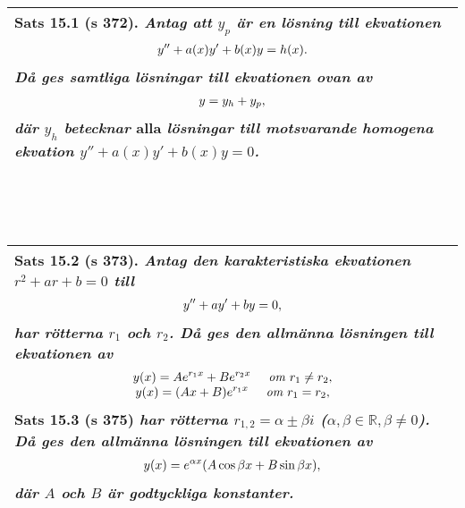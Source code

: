 \documentclass[a4paper]{article}
\begin{document}
\\\\\\
\begin{tabular}{|L{11.5cm}|} \hline
\textbf{Sats 15.1} (s 372).
\textit{Antag att $y_p$ är en lösning till ekvationen}
\begin{equation*}
\begin{array}{>{\displaystyle}c}
y''+a(x)y'+b(x)y=h(x).
\end{array}
\end{equation*}
\textit{Då ges samtliga lösningar till ekvationen ovan av}
\begin{equation*}
\begin{array}{>{\displaystyle}c}
y=y_h+y_p,
\end{array}
\end{equation*}
\textit{där $y_h$ betecknar} alla \textit{lösningar till motsvarande homogena ekvation $y''+a(x)y'+b(x)y=0$.}
\\\hline
\end{tabular}
\\\\\\
\begin{tabular}{|L{11.5cm}|} \hline
\textbf{Sats 15.2} (s 373).
\textit{Antag den karakteristiska ekvationen $r^2 + ar + b=0$ till}
\begin{equation*}
\begin{array}{>{\displaystyle}c}
y''+ay'+by=0,
\end{array}
\end{equation*}
\textit{har rötterna $r_1$ och $r_2$. Då ges den allmänna lösningen till ekvationen av}
\begin{equation*}
\begin{array}{>{\displaystyle}c}
y(x)=Ae^{r_1x}+Be^{r_2x} \hspace{0.5cm} \textit{om } r_1 \neq r_2,\\
y(x)=(Ax+B)e^{r_1x} \hspace{0.5cm} \textit{om } r_1 = r_2,
\end{array}
\end{equation*}
\textbf{Sats 15.3} (s 375) \textit{har rötterna $r_{1,2}=\alpha \pm \beta i$ ($\alpha , \beta \in \mathbb{R}, \beta \neq 0$). Då ges den allmänna lösningen till ekvationen av}
\begin{equation*}
\begin{array}{>{\displaystyle}c}
y(x)=e^{\alpha x}(A\cos \beta x + B \sin \beta x),
\end{array}
\end{equation*}
\textit{där $A$ och $B$ är godtyckliga konstanter.}
\\\hline
\end{tabular}
\end{document}
